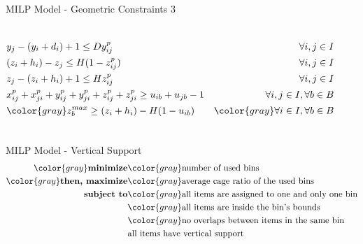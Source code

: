 \documentclass{beamer}
\begin{document}
\begin{frame}{MILP Model - Geometric Constraints 3}
\begin{columns}[onlytextwidth,T]
{\begin{minipage}{\linewidth}
\begin{align}
                                         & y_j - (y_i + d_i) + 1 \le D y^p_{ij}                                                     & \forall i,j \in I \notag \\
                                         & (z_i + h_i) - z_j\le H(1 - z^p_{ij})                                                     & \forall i,j \in I \notag \\
                                         & z_j - (z_i + h_i) + 1 \le H z^p_{ij}                                                     & \forall i,j \in I \notag \\
                                         & x^p_{ij} + x^p_{ji} + y^p_{ij} + y^p_{ji} + z^p_{ij} + z^p_{ji} \ge u_{ib} + u_{jb} - 1  & \forall i,j \in I, \forall b \in B \notag \\
                                         & \color{gray} z^{max}_b \ge (z_i + h_i) - H(1-u_{ib})                                                  & \color{gray} \forall i \in I, \forall b \in B \notag
                    \end{align}
                \end{minipage}
            }
            \end{columns}
    \end{frame}


    \begin{frame}{MILP Model - Vertical Support}
        \begin{eqnarray*}
            \color{gray} \textbf{minimize} & \color{gray} \text{number of used bins} \\
            \color{gray} \textbf{then, maximize} & \color{gray} \text{average cage ratio of the used bins} \\
            \textbf{subject to} & \color{gray} \text{all items are assigned to one and only one bin} \\
                                                & \color{gray} \text{all items are inside the bin's bounds} \\
                                                & \color{gray} \text{no overlaps between items in the same bin} \\
                                                & \text{all items have vertical support} \\
        \end{eqnarray*}
    \end{frame}
\end{document}
